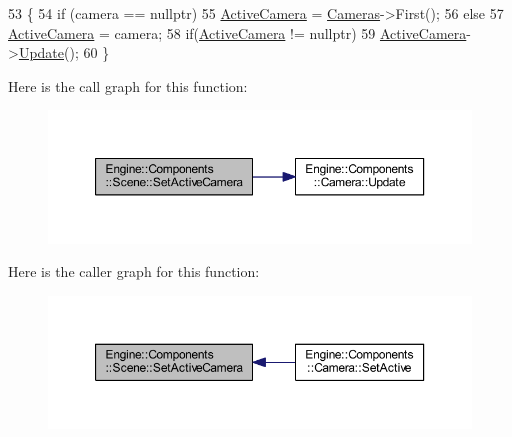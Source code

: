 \begin{DoxyCode}
53 \{
54     \textcolor{keywordflow}{if} (camera == \textcolor{keyword}{nullptr})
55         \mbox{\hyperlink{classEngine_1_1Components_1_1Scene_a9408befee37d89e2c001d25b9e4ed75a}{ActiveCamera}} = \mbox{\hyperlink{classEngine_1_1Components_1_1Scene_aea98ff1ced88ee859878b504e9a2a362}{Cameras}}->First();
56     \textcolor{keywordflow}{else}
57         \mbox{\hyperlink{classEngine_1_1Components_1_1Scene_a9408befee37d89e2c001d25b9e4ed75a}{ActiveCamera}} = camera;
58     \textcolor{keywordflow}{if}(\mbox{\hyperlink{classEngine_1_1Components_1_1Scene_a9408befee37d89e2c001d25b9e4ed75a}{ActiveCamera}} != \textcolor{keyword}{nullptr})
59         \mbox{\hyperlink{classEngine_1_1Components_1_1Scene_a9408befee37d89e2c001d25b9e4ed75a}{ActiveCamera}}->\mbox{\hyperlink{classEngine_1_1Components_1_1Camera_a364f5e22921e3d234b31297a64c7d932}{Update}}();
60 \}
\end{DoxyCode}
Here is the call graph for this function\+:
\nopagebreak
\begin{figure}[H]
\begin{center}
\leavevmode
\includegraphics[width=350pt]{classEngine_1_1Components_1_1Scene_a936218df56c481f3aa12d684cee038f3_cgraph}
\end{center}
\end{figure}
Here is the caller graph for this function\+:
\nopagebreak
\begin{figure}[H]
\begin{center}
\leavevmode
\includegraphics[width=350pt]{classEngine_1_1Components_1_1Scene_a936218df56c481f3aa12d684cee038f3_icgraph}
\end{center}
\end{figure}
\mbox{\label{classEngine_1_1Components_1_1Scene_a064ce89da5daa483369c3253f04c9d21}} 
